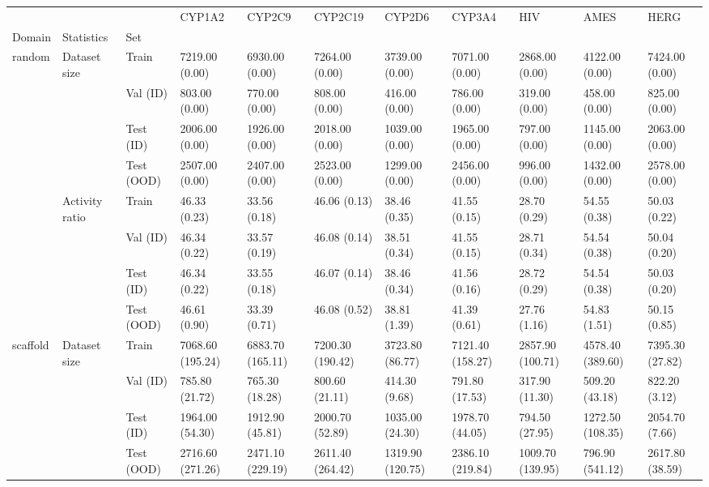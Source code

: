 \begin{tabular}{lllllllllll}
\toprule
 &  &  & CYP1A2 & CYP2C9 & CYP2C19 & CYP2D6 & CYP3A4 & HIV & AMES & HERG \\
Domain & Statistics & Set &  &  &  &  &  &  &  &  \\
\midrule
\multirow[t]{8}{*}{random} & \multirow[t]{4}{*}{Dataset size} & Train & 7219.00 (0.00) & 6930.00 (0.00) & 7264.00 (0.00) & 3739.00 (0.00) & 7071.00 (0.00) & 2868.00 (0.00) & 4122.00 (0.00) & 7424.00 (0.00) \\
 &  & Val (ID) & 803.00 (0.00) & 770.00 (0.00) & 808.00 (0.00) & 416.00 (0.00) & 786.00 (0.00) & 319.00 (0.00) & 458.00 (0.00) & 825.00 (0.00) \\
 &  & Test (ID) & 2006.00 (0.00) & 1926.00 (0.00) & 2018.00 (0.00) & 1039.00 (0.00) & 1965.00 (0.00) & 797.00 (0.00) & 1145.00 (0.00) & 2063.00 (0.00) \\
 &  & Test (OOD) & 2507.00 (0.00) & 2407.00 (0.00) & 2523.00 (0.00) & 1299.00 (0.00) & 2456.00 (0.00) & 996.00 (0.00) & 1432.00 (0.00) & 2578.00 (0.00) \\
\cline{2-11}
 & \multirow[t]{4}{*}{Activity ratio} & Train & 46.33 (0.23) & 33.56 (0.18) & 46.06 (0.13) & 38.46 (0.35) & 41.55 (0.15) & 28.70 (0.29) & 54.55 (0.38) & 50.03 (0.22) \\
 &  & Val (ID) & 46.34 (0.22) & 33.57 (0.19) & 46.08 (0.14) & 38.51 (0.34) & 41.55 (0.15) & 28.71 (0.34) & 54.54 (0.38) & 50.04 (0.20) \\
 &  & Test (ID) & 46.34 (0.22) & 33.55 (0.18) & 46.07 (0.14) & 38.46 (0.34) & 41.56 (0.16) & 28.72 (0.29) & 54.54 (0.38) & 50.03 (0.20) \\
 &  & Test (OOD) & 46.61 (0.90) & 33.39 (0.71) & 46.08 (0.52) & 38.81 (1.39) & 41.39 (0.61) & 27.76 (1.16) & 54.83 (1.51) & 50.15 (0.85) \\
\cline{1-11} \cline{2-11}
\multirow[t]{8}{*}{scaffold} & \multirow[t]{4}{*}{Dataset size} & Train & 7068.60 (195.24) & 6883.70 (165.11) & 7200.30 (190.42) & 3723.80 (86.77) & 7121.40 (158.27) & 2857.90 (100.71) & 4578.40 (389.60) & 7395.30 (27.82) \\
 &  & Val (ID) & 785.80 (21.72) & 765.30 (18.28) & 800.60 (21.11) & 414.30 (9.68) & 791.80 (17.53) & 317.90 (11.30) & 509.20 (43.18) & 822.20 (3.12) \\
 &  & Test (ID) & 1964.00 (54.30) & 1912.90 (45.81) & 2000.70 (52.89) & 1035.00 (24.30) & 1978.70 (44.05) & 794.50 (27.95) & 1272.50 (108.35) & 2054.70 (7.66) \\
 &  & Test (OOD) & 2716.60 (271.26) & 2471.10 (229.19) & 2611.40 (264.42) & 1319.90 (120.75) & 2386.10 (219.84) & 1009.70 (139.95) & 796.90 (541.12) & 2617.80 (38.59) \\

\end{tabular}

